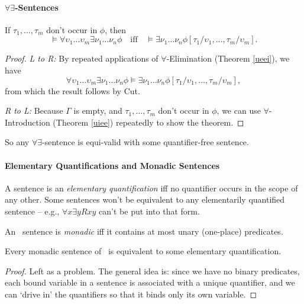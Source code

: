 \paragraph{$\forall\exists$-Sentences}

\begin{theorem}
	If $\tau_{1},\ldots,\tau_{m}$ don't occur in $\phi$, then $$\vDash \forall \upsilon_{1}\ldots\upsilon_{m}\exists\nu_{1}\ldots\nu_{n}\phi \quad\text{iff}\quad \vDash\exists\nu_{1}\ldots\nu_{n}\phi[\tau_{1}/\upsilon_{1},\ldots,\tau_{m}/\upsilon_{m}].$$ \begin{proof} 
		{\emph{L to R:} By repeated applications of $\forall$-Elimination (Theorem \ref{ueei}), we have \begin{equation*}
			\forall \upsilon_{1}\ldots\upsilon_{m}\exists\nu_{1}\ldots\nu_{n}\phi \vDash \exists\nu_{1}\ldots\nu_{n}\phi[\tau_{1}/\upsilon_{1},\ldots,\tau_{m}/\upsilon_{m}],
		\end{equation*}from which the result follows by Cut.
		
		\emph{R to L:} Because $\Gamma$ is empty, and $\tau_{1},\ldots,\tau_{m}$ don't occur in $\phi$, we can use $\forall$-Introduction (Theorem \ref{uiee}) repeatedly to show the theorem.}
	\end{proof}
\end{theorem}
So any $\forall\exists$-sentence is equi-valid with some quantifier-free sentence.

\paragraph{Elementary Quantifications and Monadic Sentences}

A sentence is an \emph{elementary quantification} iff no quantifier occurs in the scope of any other. Some sentences won't be equivalent to any elementarily quantified sentence – e.g., $\forall x\exists y Rxy$ can't be put into that form.

An \ltwo\ sentence is \emph{monadic} iff it contains at most unary (one-place) predicates.

\begin{lemma}
	Every monadic sentence of \ltwo\ is equivalent to some elementary quantification. \begin{proof}
		Left as a problem. The general idea is: since we have no binary predicates, each bound variable in a sentence is associated with a unique quantifier, and we can `drive in' the quantifiers so that it binds only its own variable.
	\end{proof}
\end{lemma}

